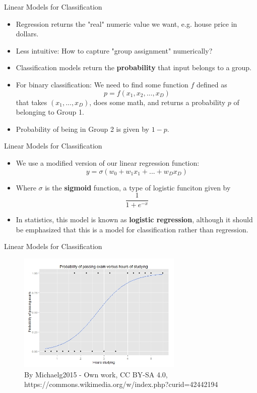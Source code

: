 \begin{frame}{Linear Models for Classification}
\begin{itemize}
    \item Regression returns the "real" numeric value we want, e.g. house price in dollars.
    \item Less intuitive: How to capture "group assignment" numerically? 
    \item Classification models return the \textbf{probability} that input belongs to a group.
    \item For binary classification: We need to find some function $f$ defined as $$p = f(x_1, x_2, ..., x_D)$$ that takes $(x_1, ..., x_D)$, does some math, and returns a probability $p$ of belonging to Group 1.
    \item Probability of being in Group 2 is given by $1-p$.
\end{itemize}
\end{frame}

\begin{frame}{Linear Models for Classification}
\begin{itemize}
    \item We use a modified version of our linear regression function:
    $$y = \sigma(w_0 + w_1x_1 + ... + w_Dx_D)$$
    \item Where $\sigma$ is the \textbf{sigmoid} function, a type of logistic funciton given by
    $$\frac{1}{1 + e^{-x}}$$
    \item In statistics, this model is known as \textbf{logistic regression}, although it should be emphasized that this is a model for classification rather than regression.
\end{itemize}
\end{frame}

\begin{frame}{Linear Models for Classification}
\begin{figure}
    \centering
    \includegraphics[width=0.7\textwidth]{img/Exam_pass_logistic_curve.jpeg}
    \caption{\label{fig:researchscope}By Michaelg2015 - Own work, CC BY-SA 4.0, https://commons.wikimedia.org/w/index.php?curid=42442194}
\end{figure}
\end{frame}
